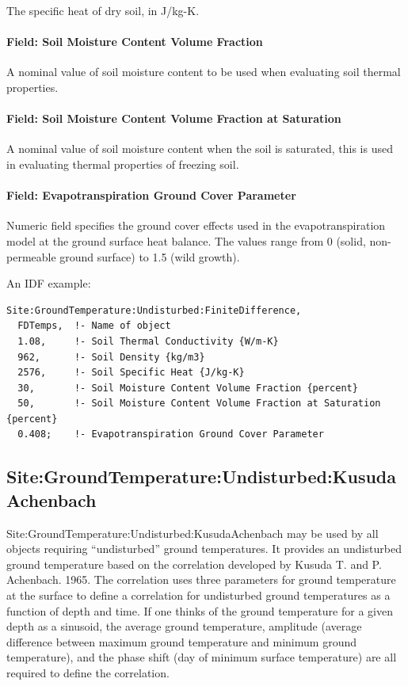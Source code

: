 The specific heat of dry soil, in J/kg-K.

\paragraph{Field: Soil Moisture Content Volume Fraction}\label{field-soil-moisture-content-volume-fraction}

A nominal value of soil moisture content to be used when evaluating soil thermal properties.

\paragraph{Field: Soil Moisture Content Volume Fraction at Saturation}\label{field-soil-moisture-content-volume-fraction-at-saturation}

A nominal value of soil moisture content when the soil is saturated, this is used in evaluating thermal properties of freezing soil.

\paragraph{Field: Evapotranspiration Ground Cover Parameter}\label{field-evapotranspiration-ground-cover-parameter}

Numeric field specifies the ground cover effects used in the evapotranspiration model at the ground surface heat balance. The values range from 0 (solid, non-permeable ground surface) to 1.5 (wild growth).

An IDF example:

\begin{lstlisting}
Site:GroundTemperature:Undisturbed:FiniteDifference,
  FDTemps,  !- Name of object
  1.08,     !- Soil Thermal Conductivity {W/m-K}
  962,      !- Soil Density {kg/m3}
  2576,     !- Soil Specific Heat {J/kg-K}
  30,       !- Soil Moisture Content Volume Fraction {percent}
  50,       !- Soil Moisture Content Volume Fraction at Saturation {percent}
  0.408;    !- Evapotranspiration Ground Cover Parameter
\end{lstlisting}

\subsection{Site:GroundTemperature:Undisturbed:KusudaAchenbach}\label{sitegroundtemperatureundisturbedkusudaachenbach}

Site:GroundTemperature:Undisturbed:KusudaAchenbach may be used by all objects requiring ``undisturbed'' ground temperatures. It provides an undisturbed ground temperature based on the correlation developed by Kusuda T. and P. Achenbach. 1965. The correlation uses three parameters for ground temperature at the surface to define a correlation for undisturbed ground temperatures as a function of depth and time. If one thinks of the ground temperature for a given depth as a sinusoid, the average ground temperature, amplitude (average difference between maximum ground temperature and minimum ground temperature), and the phase shift (day of minimum surface temperature) are all required to define the correlation.


